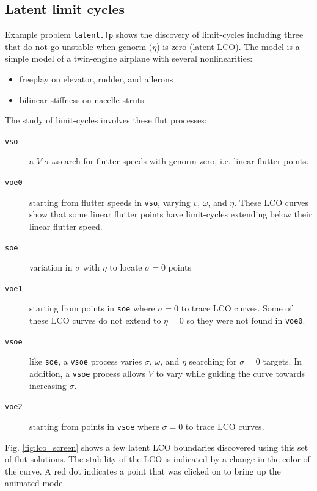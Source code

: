 \documentclass[11pt,openany,twoside]{book}
\numberwithin{equation}{section}		%
\newcommand{\Cmd}[1]{{\sf #1}}
\newcommand{\Code}[1]{{\small\tt #1}}
\newcommand{\VSO}{$V$-$\sigma$-$\omega$\:}
\newcommand{\Lco}{LCO }
\newcommand{\Gc}{gc}
\newcommand{\Figref}[1]{Fig. \ref{#1}}  %
\begin{document}
\subsection{Latent limit cycles}\label{ex:latent}
Example problem \Code{latent.fp} shows the discovery of limit-cycles including
three that do not go unstable when \Gc norm ($\eta$) is zero (latent LCO).
The model is a simple model of a twin-engine airplane with several nonlinearities:
\begin{itemize}
	\item freeplay on elevator, rudder, and ailerons
	\item bilinear stiffness on nacelle struts
\end{itemize}
The study of limit-cycles involves these \Cmd{flut} processes:
\begin{description}
	\item[\Code{vso}] a \VSO search for flutter speeds with \Gc norm zero,
	   i.e. linear flutter points.
	\item[\Code{voe0}] starting from flutter speeds in \Code{vso}, varying
	   $v$, $\omega$, and $\eta$. These \Lco curves show that some linear
		flutter points have limit-cycles extending below their linear flutter speed.
	\item[\Code{soe}] variation in $\sigma$ with $\eta$ to locate $\sigma=0$ points
	\item[\Code{voe1}] starting from points in \Code{soe} where $\sigma=0$ to
	   trace \Lco curves. Some of these \Lco curves do not extend to $\eta=0$ so
		they were not found in \Code{voe0}.
	\item[\Code{vsoe}] like \Code{soe}, a \Code{vsoe} process varies $\sigma$,
		$\omega$, and $\eta$ searching for $\sigma=0$ targets. In addition, a
		\Code{vsoe} process allows $V$ to vary while guiding the curve towards
		increasing $\sigma$.
	\item[\Code{voe2}] starting from points in \Code{vsoe} where $\sigma=0$ to
		trace \Lco curves.
\end{description}
\Figref{fig:lco_screen} shows a few latent LCO boundaries discovered using
this set of \Cmd{flut} solutions. The stability of the LCO is indicated by
a change in the color of the curve. A red dot indicates a point that was
clicked on to bring up the animated mode.
\end{document}
